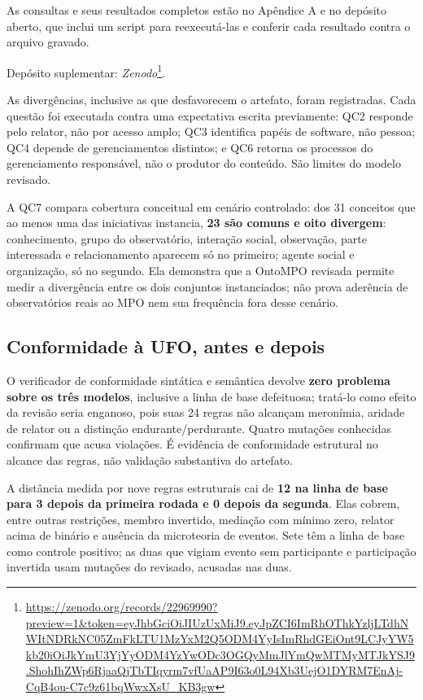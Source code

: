 As consultas e seus resultados completos estão no Apêndice A e no depósito aberto, que inclui um script para reexecutá-las e conferir cada resultado contra o arquivo gravado.

Depósito suplementar: \textit{Zenodo}\footnote{\url{https://zenodo.org/records/22969990?preview=1&token=eyJhbGciOiJIUzUxMiJ9.eyJpZCI6ImRhOThkYzljLTdhNWItNDRkNC05ZmFkLTU1MzYxM2Q5ODM4YyIsImRhdGEiOnt9LCJyYW5kb20iOiJkYmU3YjYyODM4YzYwODc3OGQyMmJlYmQwMTMyMTJkYSJ9.ShohIhZWp6RjaaQjTbTIqyrm7vfUaAP9I63o0L94Xb3UejO1DYRM7EnAj-CqB4ou-C7c9z61bqWwxXsU_KB3gw}}.

As divergências, inclusive as que desfavorecem o artefato, foram registradas. Cada questão foi executada contra uma expectativa escrita previamente: QC2 responde pelo relator, não por acesso amplo; QC3 identifica papéis de software, não pessoa; QC4 depende de gerenciamentos distintos; e QC6 retorna os processos do gerenciamento responsável, não o produtor do conteúdo. São limites do modelo revisado.

A QC7 compara cobertura conceitual em cenário controlado: dos 31 conceitos que ao menos uma das iniciativas instancia, \textbf{23 são comuns e oito divergem}: conhecimento, grupo do observatório, interação social, observação, parte interessada e relacionamento aparecem só no primeiro; agente social e organização, só no segundo. Ela demonstra que a OntoMPO revisada permite medir a divergência entre os dois conjuntos instanciados; não prova aderência de observatórios reais ao MPO nem sua frequência fora desse cenário.

\subsection{Conformidade à UFO, antes e depois}

O verificador de conformidade sintática e semântica devolve \textbf{zero problema sobre os três modelos}, inclusive a linha de base defeituosa; tratá-lo como efeito da revisão seria enganoso, pois suas 24 regras não alcançam meronímia, aridade de relator ou a distinção endurante/perdurante. Quatro mutações conhecidas confirmam que acusa violações. É evidência de conformidade estrutural no alcance das regras, não validação substantiva do artefato.

A distância medida por nove regras estruturais cai de \textbf{12 na linha de base para 3 depois da primeira rodada e 0 depois da segunda}. Elas cobrem, entre outras restrições, membro invertido, mediação com mínimo zero, relator acima de binário e ausência da microteoria de eventos. Sete têm a linha de base como controle positivo; as duas que vigiam evento sem participante e participação invertida usam mutações do revisado, acusadas nas duas.

